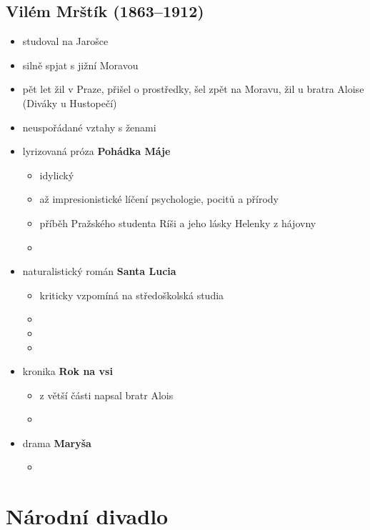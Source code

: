 \subsection{Vilém Mrštík (1863--1912)}
\begin{itemize}
\item studoval na Jarošce
\item silně spjat s jižní Moravou
\item pět let žil v Praze, přišel o prostředky, šel zpět na Moravu, žil u bratra Aloise (Diváky u Hustopečí)
\item neuspořádané vztahy s ženami
\item lyrizovaná próza \textbf{Pohádka Máje}
	\begin{itemize}
	\item idylický
	\item až impresionistické líčení psychologie, pocitů a přírody
	\item příběh Pražského studenta Ríši a jeho lásky Helenky z hájovny
	\item 
	\end{itemize}
\item naturalistický román \textbf{Santa Lucia}
	\begin{itemize}
	\item kriticky vzpomíná na středoškolská studia
	\item 
	\item 
	\item 
	\end{itemize}
\item kronika \textbf{Rok na vsi}
	\begin{itemize}
	\item z větší části napsal bratr Alois
	\item 
	\end{itemize}
\item drama \textbf{Maryša}
	\begin{itemize}
	\item 
	\end{itemize}
\end{itemize}

\section{Národní divadlo}
